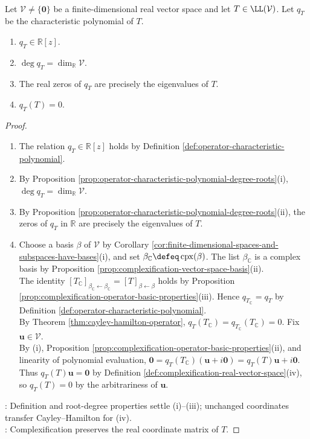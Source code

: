 \begin{theorem} \label{thm:real-operator-characteristic-polynomial-properties} \\
Let $\mathcal{V}\neq\{\mathbf{0}\}$ be a finite-dimensional real vector space and let $T\in\LL(\mathcal{V})$. Let $q_T$ be the characteristic polynomial of $T$.
\begin{enumerate}[label=(\roman*)]
\setlength{\itemsep}{0pt}
\item $q_T\in\mathbb{R}[z]$.
\item $\deg q_T=\dim_{\mathbb{R}}\mathcal{V}$.
\item The real zeros of $q_T$ are precisely the eigenvalues of $T$.
\item $q_T(T)=0$.
\end{enumerate}
\begin{proof}
\begin{enumerate}[label=(\roman*)]
\setlength{\itemsep}{0pt}
\item The relation $q_T\in\mathbb{R}[z]$ holds by Definition \ref{def:operator-characteristic-polynomial}.
\item By Proposition \ref{prop:operator-characteristic-polynomial-degree-roots}(i), $\deg q_T=\dim_{\mathbb{R}}\mathcal{V}$.
\item By Proposition \ref{prop:operator-characteristic-polynomial-degree-roots}(ii), the zeros of $q_T$ in $\mathbb{R}$ are precisely the eigenvalues of $T$.
\item Choose a basis $\beta$ of $\mathcal{V}$ by Corollary \ref{cor:finite-dimensional-spaces-and-subspaces-have-bases}(i), and set $\beta_{\mathbb{C}}\defeq\operatorname{cpx}(\beta)$. The list $\beta_{\mathbb{C}}$ is a complex basis by Proposition \ref{prop:complexification-vector-space-basis}(ii).\\
The identity $[T_{\mathbb{C}}]_{\beta_{\mathbb{C}}\leftarrow\beta_{\mathbb{C}}}=[T]_{\beta\leftarrow\beta}$ holds by Proposition \ref{prop:complexification-operator-basic-properties}(iii). Hence $q_{T_{\mathbb{C}}}=q_T$ by Definition \ref{def:operator-characteristic-polynomial}.\\
By Theorem \ref{thm:cayley-hamilton-operator}, $q_T(T_{\mathbb{C}})=q_{T_{\mathbb{C}}}(T_{\mathbb{C}})=0$. Fix $\mathbf{u}\in\mathcal{V}$.\\
By (i), Proposition \ref{prop:complexification-operator-basic-properties}(ii), and linearity of polynomial evaluation, $\mathbf{0}=q_T(T_{\mathbb{C}})(\mathbf{u}+i\mathbf{0})=q_T(T)\mathbf{u}+i\mathbf{0}$.\\
Thus $q_T(T)\mathbf{u}=\mathbf{0}$ by Definition \ref{def:complexification-real-vector-space}(iv), so $q_T(T)=0$ by the arbitrariness of $\mathbf{u}$.
\end{enumerate}
: Definition and root-degree properties settle (i)--(iii); unchanged coordinates transfer Cayley--Hamilton for (iv).\\
: Complexification preserves the real coordinate matrix of $T$.
\end{proof}
\end{theorem}

